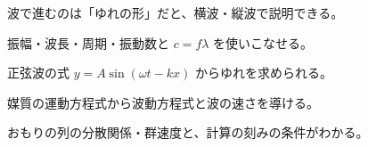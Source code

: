 \begin{furikaeri}
\begin{checklist}
\item 波で進むのは「ゆれの形」だと、横波・縦波で説明できる。
\item 振幅・波長・周期・振動数と $c=f\lambda$ を使いこなせる。
\item 正弦波の式 $y=A\sin(\omega t-kx)$ からゆれを求められる。
\item 媒質の運動方程式から波動方程式と波の速さを導ける。
\item おもりの列の分散関係・群速度と、計算の刻みの条件がわかる。
\end{checklist}
\end{furikaeri}
